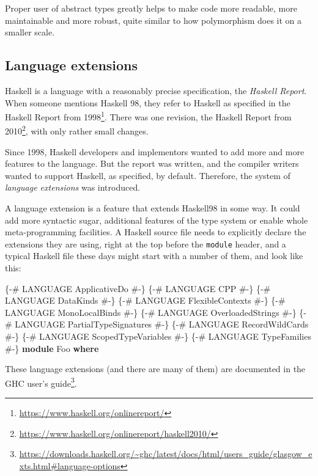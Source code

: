 \documentclass[11pt,
  american,
  DIV13]{article}
\newenvironment{Shaded}{}{}
\newcommand{\DataTypeTok}[1]{\textcolor[rgb]{0.56,0.13,0.00}{#1}}
\newcommand{\KeywordTok}[1]{\textcolor[rgb]{0.00,0.44,0.13}{\textbf{#1}}}
\newcommand{\OtherTok}[1]{\textcolor[rgb]{0.00,0.44,0.13}{#1}}
\DeclareRobustCommand{\href}[2]{#2\footnote{\url{#1}}}
\begin{document}
Proper user of abstract types greatly helps to make code more readable,
more maintainable and more robust, quite similar to how polymorphism
does it on a smaller scale.

\hypertarget{language-extensions}{%
\subsection{Language extensions}\label{language-extensions}}

Haskell is a language with a reasonably precise specification, the
\emph{Haskell Report}. When someone mentions Haskell 98, they refer to
Haskell as specified in the
\href{https://www.haskell.org/onlinereport/}{Haskell Report from 1998}.
There was one revision, the
\href{https://www.haskell.org/onlinereport/haskell2010/}{Haskell Report
from 2010}, with only rather small changes.

Since 1998, Haskell developers and implementors wanted to add more and
more features to the language. But the report was written, and the
compiler writers wanted to support Haskell, as specified, by default.
Therefore, the system of \emph{language extensions} was introduced.

A language extension is a feature that extends Haskell98 in some way. It
could add more syntactic sugar, additional features of the type system
or enable whole meta-programming facilities. A Haskell source file needs
to explicitly declare the extensions they are using, right at the top
before the \texttt{module} header, and a typical Haskell file these days
might start with a number of them, and look like this:

\begin{Shaded}
\begin{Highlighting}[]
\OtherTok{\{{-}\# LANGUAGE ApplicativeDo \#{-}\}}
\OtherTok{\{{-}\# LANGUAGE CPP \#{-}\}}
\OtherTok{\{{-}\# LANGUAGE DataKinds \#{-}\}}
\OtherTok{\{{-}\# LANGUAGE FlexibleContexts \#{-}\}}
\OtherTok{\{{-}\# LANGUAGE MonoLocalBinds \#{-}\}}
\OtherTok{\{{-}\# LANGUAGE OverloadedStrings \#{-}\}}
\OtherTok{\{{-}\# LANGUAGE PartialTypeSignatures \#{-}\}}
\OtherTok{\{{-}\# LANGUAGE RecordWildCards \#{-}\}}
\OtherTok{\{{-}\# LANGUAGE ScopedTypeVariables \#{-}\}}
\OtherTok{\{{-}\# LANGUAGE TypeFamilies \#{-}\}}
\KeywordTok{module} \DataTypeTok{Foo} \KeywordTok{where}
\end{Highlighting}
\end{Shaded}

These language extensions (and there are many of them) are
\href{https://downloads.haskell.org/~ghc/latest/docs/html/users_guide/glasgow_exts.html\#language-options}{documented
in the GHC user's guide}.
\end{document}
